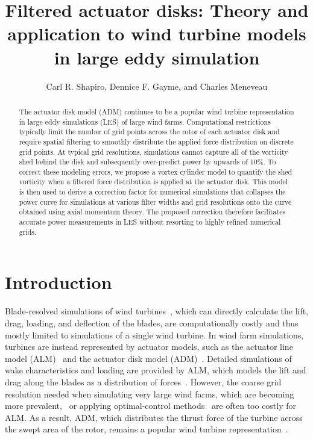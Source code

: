 \documentclass{article}
\begin{document}
\title{Filtered actuator disks: Theory and application to wind turbine models in large eddy simulation}
\author{Carl R. Shapiro, Dennice F. Gayme, and Charles Meneveau}
\date{}

\maketitle

\begin{abstract}
The actuator disk model (ADM) continues to be a popular wind turbine representation in large eddy simulations (LES) of large wind farms. Computational restrictions typically limit the number of grid points across the rotor of each actuator disk and require spatial filtering to smoothly distribute the applied force distribution on discrete grid points. At typical grid resolutions, simulations cannot capture all of the vorticity shed behind the disk and subsequently over-predict power by upwards of 10\%. To correct these modeling errors, we propose a vortex cylinder model to quantify the shed vorticity when a filtered force distribution is applied at the actuator disk. This model is then used to derive a correction factor for numerical simulations that collapses the power curve for simulations at various filter widths and grid resolutions onto the curve obtained using axial momentum theory. The proposed correction therefore facilitates accurate power measurements in LES without resorting to highly refined numerical grids.
\end{abstract}

\section{Introduction}
Blade-resolved simulations of wind turbines~\cite{Vijayakumar2016a}, which can directly calculate the lift, drag, loading, and deflection of the blades, are computationally costly and thus mostly limited to simulations of a single wind turbine. In wind farm simulations, turbines are instead represented by actuator models, such as the actuator line model (ALM)~\cite{Sorensen2002a, Martinez2018a} and the actuator disk model (ADM)~\cite{Burton2011a}. Detailed simulations of wake characteristics and loading are provided by ALM, which models the lift and drag along the blades as a distribution of forces~\cite{Sorensen2002a, Martinez2018a}. However, the coarse grid resolution needed when simulating very large wind farms, which are becoming more prevalent,~\cite{Allaerts2018a} or applying optimal-control methods~\cite{Goit2015a} are often too costly for ALM. As a result, ADM, which distributes the thrust force of the turbine across the swept area of the rotor, remains a popular wind turbine representation~\cite{Iungo2017a, Stevens2018a, Lignarolo2016a}.
\end{document}
